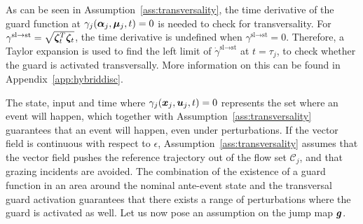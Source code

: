 \documentclass[../DC2017114Bouma.tex]{subfiles}
\begin{document}
\begin{sloppypar}
\begin{myremark}
As can be seen in Assumption~\ref{ass:transversality}, the time derivative of the guard function at $\gamma_j(\boldsymbol{\alpha}_j,\boldsymbol{\mu}_j,t) = 0$ is needed to check for transversality. For $\gamma^{\text{sl}\rightarrow\text{st}} = \sqrt{\boldsymbol{\zeta}_t^T\boldsymbol{\zeta}_t}$, the time derivative is undefined when $\gamma^{\text{sl}\rightarrow\text{st}} = 0$. Therefore, a Taylor expansion is used to find the left limit of $\dot{\gamma}^{\text{sl}\rightarrow\text{st}}$ at $t = \tau_j$, to check whether the guard is activated transversally. More information on this can be found in Appendix~\ref{app:hybriddisc}.
\end{myremark}
\end{sloppypar}



The state, input and time where $\gamma_j({\boldsymbol{x}}_j,{\boldsymbol{u}}_j,t) = 0$ represents the set where an event will happen, which together with Assumption~\ref{ass:transversality} guarantees that an event will happen, even under perturbations. If the vector field is continuous with respect to $\epsilon$, Assumption~\ref{ass:transversality} assumes that the vector field pushes the reference trajectory out of the flow set $\mathcal{C}_j$, and that grazing incidents are avoided. The combination of the existence of a guard function in an area around the nominal ante-event state and the transversal guard activation guarantees that there exists a range of perturbations where the guard is activated as well. Let us now pose an assumption on the jump map ${\boldsymbol{g}}$.
\end{document}
